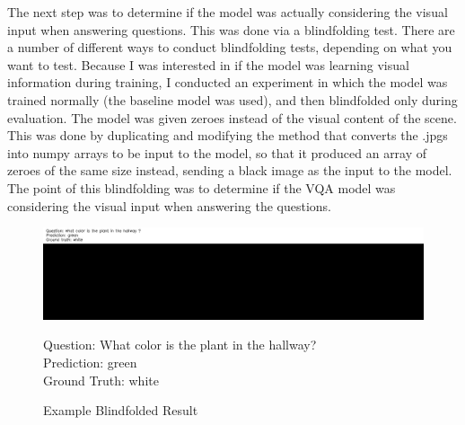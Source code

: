 The next step was to determine if the model was actually considering the visual input when answering questions. This was done via a blindfolding test. There are a number of different ways to conduct blindfolding tests, depending on what you want to test. Because I was interested in if the model was learning visual information during training, I conducted an experiment in which the model was trained normally (the baseline model was used), and then blindfolded only during evaluation. The model was given zeroes instead of the visual content of the scene. This was done by duplicating and modifying the method that converts the .jpgs into numpy arrays to be input to the model, so that it produced an array of zeroes of the same size instead, sending a black image as the input to the model. The point of this blindfolding was to determine if the VQA model was considering the visual input when answering the questions. 
\begin{figure}[H]
	\centering
        \includegraphics[width=\textwidth]{./figure/results/baseline_and_blindfolding/blindfolded/ckpt_23_1250_image.jpg}
	\captionsetup{justification=raggedright, textfont=footnotesize}
	\caption*{Question: What color is the plant in the hallway? \\
	Prediction: green \\
	Ground Truth: white}
    \captionsetup{labelfont=bf, textfont=normal,
			justification=centering,
			singlelinecheck=false}
	\caption{Example Blindfolded Result}
	\label{fig:example_blindfolded_result}
\end{figure}

